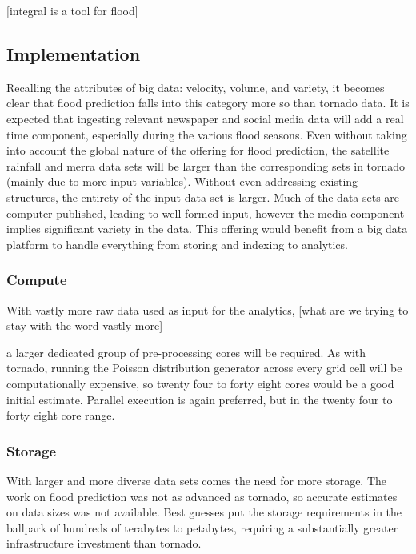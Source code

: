 [integral is a tool for flood]


\subsection{Implementation}
Recalling the attributes of big data: velocity, volume, and variety, it becomes clear that flood prediction falls into this category more so than tornado data. It is expected that ingesting relevant newspaper and social media data will add a real time component, especially during the various flood seasons. Even without taking into account the global nature of the offering for flood prediction, the satellite rainfall and \gls{merra} data sets will be larger than the corresponding sets in tornado (mainly due to more input variables). Without even addressing existing structures, the entirety of the input data set is larger. Much of the data sets are computer published, leading to well formed input, however the media component implies significant variety in the data.  This offering would benefit from a big data platform to handle everything from storing and indexing to analytics.
\subsubsection{Compute}
 With vastly more raw data used as input for the analytics,
 [what are we trying to stay with the word vastly more]
 
  a larger dedicated group of pre-processing cores will be required. As with tornado, running the Poisson distribution generator across every grid cell will be computationally expensive, so twenty four to forty eight cores would be a good initial estimate. Parallel execution is again preferred, but in the twenty four to forty eight core range. 
\subsubsection{Storage}
With larger and more diverse data sets comes the need for more storage. The work on flood prediction was not as advanced as tornado, so accurate estimates on data sizes was not available. Best guesses put the storage requirements in the ballpark of hundreds of terabytes to petabytes, requiring a substantially greater infrastructure investment than tornado.


